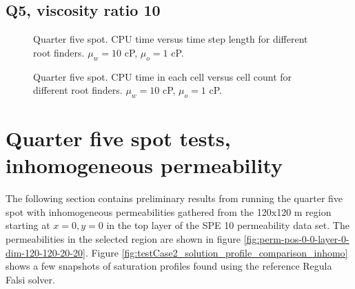 \documentclass[a4paper,12pt]{report}
\begin{document}
\clearpage
\subsection{Q5, viscosity ratio 10}
\begin{figure}[!ht]
\begin{center}

\end{center}
\caption{Quarter five spot. CPU time versus time step length for different root finders. $\mu_w = 10$ cP, $\mu_o = 1$ cP.}
\end{figure}

\begin{figure}[!ht]
\begin{center}

\end{center}
\caption{Quarter five spot. CPU time in each cell versus cell count for different root finders. $\mu_w = 10$ cP, $\mu_o = 1$ cP.}
\end{figure}

\clearpage

\section{Quarter five spot tests, inhomogeneous permeability}
The following section contains preliminary results from running the quarter five spot with inhomogeneous permeabilities gathered from the 120x120 m region starting at $x = 0, y = 0$ in the top layer of the SPE 10 permeability data set. The permeabilities in the selected region are shown in figure \ref{fig:perm-pos-0-0-layer-0-dim-120-120-20-20}. Figure \ref{fig:testCase2_solution_profile_comparison_inhomo} shows a few snapshots of saturation profiles found using the reference Regula Falsi solver.
\end{document}
